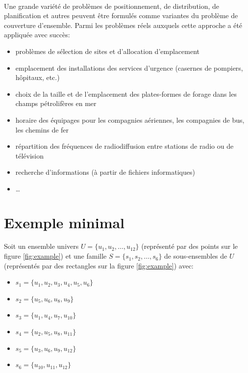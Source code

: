\documentclass[12pt,letterpaper,twoside]{article}
\begin{document}
			\paragraph*{}
				Une grande variété de problèmes de positionnement, de distribution, de planification et autres peuvent être formulés comme variantes du problème de couverture d'ensemble. Parmi les problèmes réels auxquels cette approche a été appliquée avec succès:\cite{Balas1982}
				\begin{itemize}
					\item problèmes de sélection de sites et d'allocation d'emplacement
					\item emplacement des installations des services d'urgence (casernes de pompiers, hôpitaux, etc.)
					\item choix de la taille et de l'emplacement des plates-formes de forage dans les champs pétrolifères en mer
					\item horaire des équipages pour les compagnies aériennes, les compagnies de bus, les chemins de fer
					\item répartition des fréquences de radiodiffusion entre stations de radio ou de télévision
					\item recherche d'informations (à partir de fichiers informatiques)
					\item \ldots
				\end{itemize}
	\newpage\section{Exemple minimal}
		\paragraph*{}
			Soit un ensemble univers \(U = \{u_1, u_2, \dots, u_{12}\}\) (représenté par des points sur le figure \ref{fig:example}) et une famille \(S = \{s_1, s_2, \dots, s_6\}\) de sous-ensembles de \(U\) (représentés par des rectangles sur la figure \ref{fig:example}) avec:
			\begin{itemize}
				\item \(s_1 = \{u_1, u_2, u_3, u_4, u_5, u_6\}\)
				\item \(s_2 = \{u_5, u_6, u_8, u_9\}\)
				\item \(s_3 = \{u_1, u_4, u_7, u_{10}\}\)
				\item \(s_4 = \{u_2, u_5, u_8, u_{11}\}\)
				\item \(s_5 = \{u_3, u_6, u_9, u_{12}\}\)
				\item \(s_6 = \{u_{10}, u_{11}, u_{12}\}\)
			\end{itemize}
\end{document}
